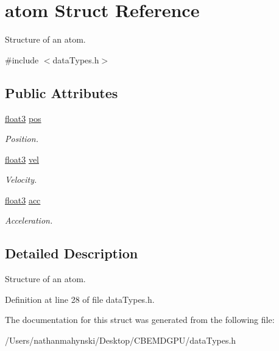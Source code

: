 \hypertarget{structatom}{\section{atom Struct Reference}
\label{structatom}
}


Structure of an atom.  




{\ttfamily \#include $<$data\-Types.\-h$>$}

\subsection*{Public Attributes}
\begin{DoxyCompactItemize}
\item 
\hypertarget{structatom_a6f304469ecac52a860f325ae6ac9ca34}{\hyperlink{structfloat3}{float3} \hyperlink{structatom_a6f304469ecac52a860f325ae6ac9ca34}{pos}}\label{structatom_a6f304469ecac52a860f325ae6ac9ca34}

\begin{DoxyCompactList}\small\item\em Position. \end{DoxyCompactList}\item 
\hypertarget{structatom_a010b2c50c7cdb6e4ec796e0c369e84d9}{\hyperlink{structfloat3}{float3} \hyperlink{structatom_a010b2c50c7cdb6e4ec796e0c369e84d9}{vel}}\label{structatom_a010b2c50c7cdb6e4ec796e0c369e84d9}

\begin{DoxyCompactList}\small\item\em Velocity. \end{DoxyCompactList}\item 
\hypertarget{structatom_a0d0e70ef3922064b59b805ac0f81d460}{\hyperlink{structfloat3}{float3} \hyperlink{structatom_a0d0e70ef3922064b59b805ac0f81d460}{acc}}\label{structatom_a0d0e70ef3922064b59b805ac0f81d460}

\begin{DoxyCompactList}\small\item\em Acceleration. \end{DoxyCompactList}\end{DoxyCompactItemize}


\subsection{Detailed Description}
Structure of an atom. 

Definition at line 28 of file data\-Types.\-h.



The documentation for this struct was generated from the following file\-:\begin{DoxyCompactItemize}
\item 
/\-Users/nathanmahynski/\-Desktop/\-C\-B\-E\-M\-D\-G\-P\-U/data\-Types.\-h\end{DoxyCompactItemize}
